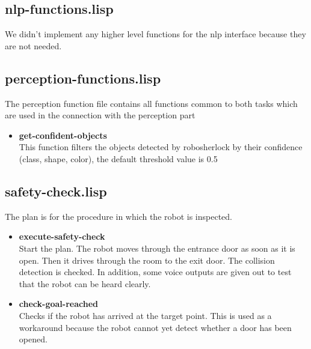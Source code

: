 \documentclass[main.tex]{subfiles}
\begin{document}
	    \subsection{nlp-functions.lisp}
	     We didn't implement any higher level functions for the nlp interface because they are not needed.
	    \subsection{perception-functions.lisp}
	    The perception function file contains all functions common to both tasks which are used in the connection with the perception part
	    \begin{itemize}
	    	\item \textbf{get-confident-objects} \\
	    	This function filters the objects detected by robosherlock by their confidence (class, shape, color), the default threshold value is 0.5
	    \end{itemize}
	    \subsection{safety-check.lisp}
	    The plan is for the procedure in which the robot is inspected. 
	    \begin{itemize}
	    	\item \textbf{execute-safety-check} \\
	    	Start the plan. The robot moves through the entrance door as soon as it is open. Then it drives through the room to the exit door. The collision detection is checked. In addition, some voice outputs are given out to test that the robot can be heard clearly.
	    	\item \textbf{check-goal-reached}\\
	    	Checks if the robot has arrived at the target point. This is used as a workaround because the robot cannot yet detect whether a door has been opened.
	    \end{itemize}
\end{document}
